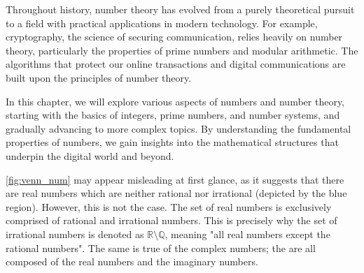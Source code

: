 Throughout history, number theory has evolved from a purely theoretical pursuit to a field with practical applications in modern technology. For example, cryptography, the science of securing communication, relies heavily on number theory, particularly the properties of prime numbers and modular arithmetic. The algorithms that protect our online transactions and digital communications are built upon the principles of number theory.

In this chapter, we will explore various aspects of numbers and number theory, starting with the basics of integers, prime numbers, and number systems, and gradually advancing to more complex topics. By understanding the fundamental properties of numbers, we gain insights into the mathematical structures that underpin the digital world and beyond.

\begin{remark}
    \autoref{fig:venn_num} may appear misleading at first glance, as it suggests that there are real numbers which are neither rational nor irrational (depicted by the blue region). However, this is not the case. The set of real numbers is exclusively comprised of rational and irrational numbers. This is precisely why the set of irrational numbers is denoted as \(\mathbb{R} \setminus \mathbb{Q}\), meaning "all real numbers except the rational numbers". The same is true of the complex numbers; the are all composed of the real numbers and the imaginary numbers.
\end{remark}


